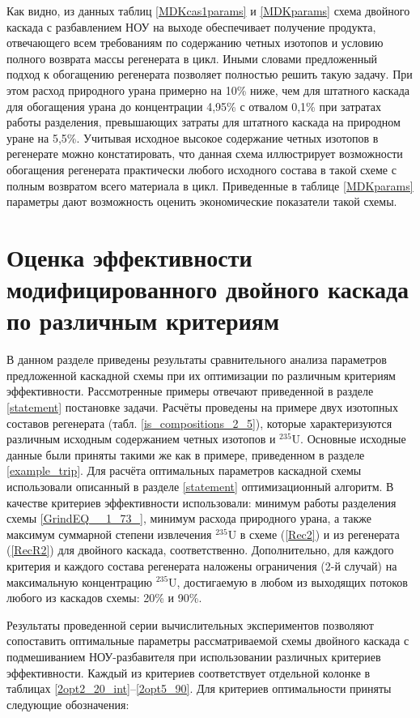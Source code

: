 Как видно, из данных таблиц \ref{MDKcas1params} и \ref{MDKparams} схема двойного каскада с разбавлением НОУ на выходе обеспечивает получение продукта, отвечающего всем требованиям по содержанию четных изотопов и условию полного возврата массы регенерата в цикл. Иными словами предложенный подход к обогащению регенерата позволяет полностью решить такую задачу. При этом расход природного урана примерно на 10\% ниже, чем для штатного каскада для обогащения урана до концентрации 4,95\% с отвалом 0,1\% при затратах работы разделения, превышающих затраты для штатного каскада на природном уране на 5,5\%. Учитывая исходное высокое содержание четных изотопов в регенерате можно констатировать, что  данная схема иллюстрирует возможности обогащения регенерата практически любого исходного состава в такой схеме с полным возвратом всего материала в цикл. Приведенные в таблице \ref{MDKparams} параметры дают возможность оценить экономические показатели такой схемы.


\section{Оценка эффективности модифицированного двойного каскада по различным критериям}

В данном разделе приведены результаты сравнительного анализа параметров предложенной каскадной схемы при их оптимизации по различным критериям эффективности. Рассмотренные примеры отвечают приведенной в разделе \ref{statement} постановке задачи. Расчёты проведены на примере двух изотопных составов регенерата (табл. \ref{is_compositions_2_5}), которые характеризуются различным исходным содержанием четных изотопов и $^{235}$U. Основные исходные данные были приняты такими же как в примере, приведенном в разделе \ref{example_trip}. Для расчёта оптимальных параметров каскадной схемы использовали описанный в разделе \ref{statement} оптимизационный алгоритм. В качестве критериев эффективности использовали: минимум работы разделения схемы \ref{GrindEQ__1_73_}, минимум расхода природного урана, а также максимум суммарной степени извлечения $^{235}$U в схеме (\ref{Rec2}) и из регенерата (\ref{RecR2}) для двойного каскада, соответственно. Дополнительно, для каждого критерия и каждого состава регенерата наложены ограничения (2-й случай) на максимальную концентрацию $^{235}$U, достигаемую в любом из выходящих потоков любого из каскадов схемы: 20\% и 90\%. 

Результаты проведенной серии вычислительных экспериментов позволяют сопоставить оптимальные параметры рассматриваемой схемы двойного каскада с подмешиванием НОУ-разбавителя при использовании различных критериев эффективности. Каждый из критериев соответствует отдельной колонке в таблицах \ref{2opt2_20_int}--\ref{2opt5_90}. Для критериев оптимальности приняты следующие обозначения:


